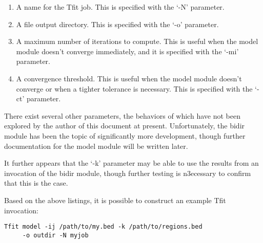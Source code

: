 \documentclass[12pt,letterpaper]{article}
\begin{document}
\begin{enumerate}
\item A name for the Tfit job. This is specified with the `-N' parameter.
\item A file output directory. This is specified with the `-o' parameter.
\item A maximum number of iterations to compute. This is useful when the model module doesn't converge immediately, and it is specified with the `-mi' parameter.
\item A convergence threshold. This is useful when the model module doesn't converge or when a tighter tolerance is necessary. This is specified with the `-ct' parameter.
\end{enumerate}

There exist several other parameters, the behaviors of which have not been explored by the author of this document at present. Unfortunately, the bidir module has been the topic of significantly more development, though further documentation for the model module will be written later. 

It further appears that the `-k' parameter may be able to use the results from an invocation of the bidir module, though further testing is n3ecessary to confirm that this is the case.

Based on the above listings, it is possible to construct an example Tfit invocation:
\begin{lstlisting}
Tfit model -ij /path/to/my.bed -k /path/to/regions.bed 
     -o outdir -N myjob
\end{lstlisting}
\end{document}
